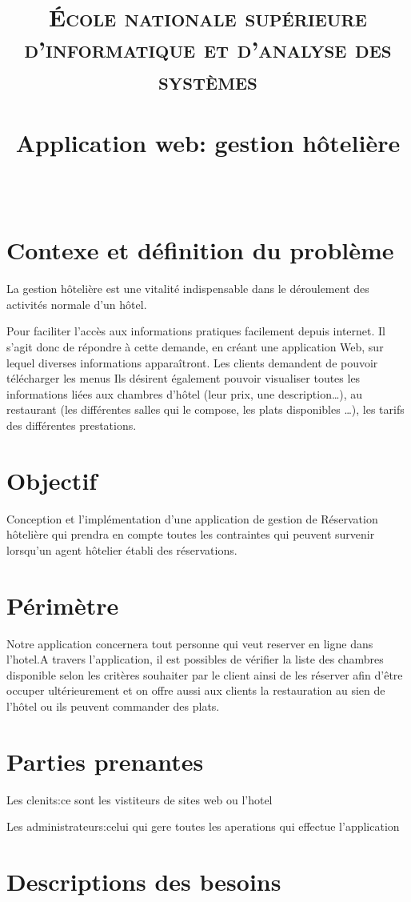 \documentclass[paper=a4, fontsize=11pt]{scrartcl}
\title{	
\normalfont \normalsize 
\textsc{École nationale supérieure d'informatique et d'analyse des systèmes} \\ [25pt] 
\horrule{0.5pt} \\[0.4cm] 
\huge Application web: gestion hôtelière \\ 
\horrule{2pt} \\[0.5cm] 
}
\begin{document}
\maketitle 


\section{Contexe et définition du problème}
La gestion hôtelière est une vitalité indispensable dans le déroulement des activités normale d’un hôtel.~\par
Pour faciliter l’accès aux informations pratiques facilement depuis internet. Il s’agit donc de répondre à cette demande, en créant une application Web, sur lequel diverses informations apparaîtront. Les clients demandent de pouvoir télécharger les menus Ils désirent également pouvoir visualiser toutes les informations liées aux chambres d’hôtel (leur prix, une description…), au restaurant (les différentes salles qui le compose, les plats disponibles …), les tarifs des différentes prestations.

 
\section{Objectif}
Conception et l’implémentation d’une application de gestion de Réservation hôtelière qui prendra en compte toutes les contraintes qui peuvent survenir lorsqu’un agent hôtelier établi des réservations.
\section{Périmètre}
Notre application concernera tout personne qui veut reserver en ligne dans l'hotel.A travers l'application, il est possibles de vérifier la liste des chambres disponible selon les critères souhaiter par le client ainsi de les réserver afin d’être occuper ultérieurement et on offre aussi aux clients la restauration au sien de l’hôtel ou ils peuvent commander des plats.
\section{Parties prenantes }
Les clenits:ce sont les vistiteurs de sites web ou l'hotel
~\par
Les administrateurs:celui qui gere toutes les aperations qui effectue l'application


\section{Descriptions des besoins }
\end{document}
